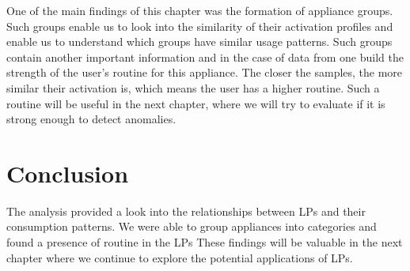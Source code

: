 One of the main findings of this chapter was the formation of appliance groups.
Such groups enable us to look into the similarity of their activation profiles and enable us to understand which groups have similar usage patterns.
Such groups contain another important information and in the case of data from one build the strength of the user's routine for this appliance.
The closer the samples, the more similar their activation is, which means the user has a higher routine.
Such a routine will be useful in the next chapter, where we will try to evaluate if it is strong enough to detect anomalies.

\section{Conclusion}

The analysis provided a look into the relationships between LPs and their consumption patterns.
We were able to group appliances into categories and found a presence of routine in the LPs
These findings will be valuable in the next chapter where we continue to explore the potential applications of LPs.

